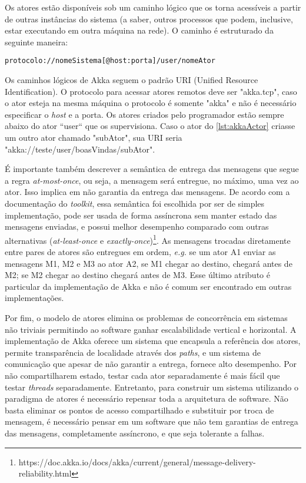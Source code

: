 Os atores estão disponíveis sob um caminho lógico que os torna acessíveis a partir de outras instâncias do sistema (a saber, outros processos que podem, inclusive, estar executando em outra máquina na rede). O caminho é estruturado da seguinte maneira: 

\begin{lstlisting}[caption={Esquema da URI de um ator }]
 protocolo://nomeSistema[@host:porta]/user/nomeAtor 
\end{lstlisting}

Os caminhos lógicos de Akka seguem o padrão URI (Unified Resource Identification). O protocolo para acessar atores remotos deve ser "akka.tcp", caso o ator esteja na mesma máquina o protocolo é somente "akka" e não é necessário especificar o \textit{host} e a porta. Os atores criados pelo programador estão sempre abaixo do ator ``user`` que os supervisiona. Caso o ator do \autoref{lst:akkaActor} criasse um outro ator chamado "subAtor", sua URI seria "akka://teste/user/boasVindas/subAtor".

É importante também descrever a semântica de entrega das mensagens que segue a regra \textit{at-most-once}, ou seja, a mensagem será entregue, no máximo, uma vez ao ator. Isso implica em não garantia da entrega das mensagens. De acordo com a documentação do \textit{toolkit}, essa semântica foi escolhida por ser de simples implementação, pode ser usada de forma assíncrona sem manter estado das mensagens enviadas, e possui melhor desempenho comparado com outras alternativas (\textit{at-least-once} e \textit{exactly-once})\footnote{https://doc.akka.io/docs/akka/current/general/message-delivery-reliability.html}. As mensagens trocadas diretamente entre pares de atores são entregues em ordem, \textit{e.g.} se um ator A1 enviar as mensagens M1, M2 e M3 ao ator A2, se M1 chegar ao destino, chegará antes de M2; se M2 chegar ao destino chegará antes de M3. Esse último atributo é particular da implementação de Akka e não é comum ser encontrado em outras implementações.  

Por fim, o modelo de atores elimina os problemas de concorrência em sistemas não triviais permitindo ao software ganhar escalabilidade vertical e horizontal. A implementação de Akka oferece um sistema que encapsula a referência dos atores, permite transparência de localidade através dos \textit{paths}, e um sistema de comunicação que apesar de não garantir a entrega, fornece alto desempenho. Por não compartilharem estado, testar cada ator separadamente é mais fácil que testar \textit{threads} separadamente. Entretanto, para construir um sistema utilizando o paradigma de atores é necessário repensar toda a arquitetura de software.  Não basta eliminar os pontos de acesso compartilhado e substituir por troca de mensagem, é necessário pensar em um software que não tem garantias de entrega das mensagens, completamente assíncrono, e que seja tolerante a falhas.

